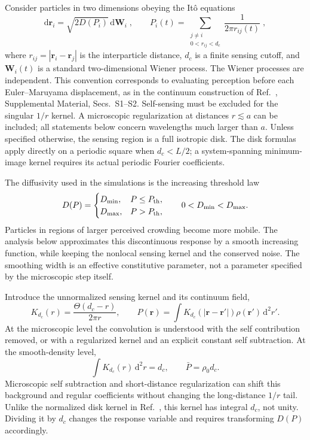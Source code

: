 \documentclass{article}
\begin{document}
Consider particles in two dimensions obeying the It\^{o} equations
\begin{equation}
    \mathrm d\mathbf r_i=\sqrt{2D(P_i)}\,\mathrm d\mathbf W_i \;,
    \qquad
    P_i(t)=\sum_{\substack{j\ne i\\0<r_{ij}<d_c}}\frac{1}{2\pi r_{ij}(t)}\;,
    \label{eq:ffParticle}
\end{equation}
where $r_{ij}=|\mathbf r_i-\mathbf r_j|$ is the interparticle distance, $d_c$ is a finite sensing cutoff, and $\mathbf W_i(t)$ is a standard two-dimensional Wiener process. 
The Wiener processes are independent. This convention corresponds to evaluating perception before each Euler--Maruyama displacement, as in the continuum construction of Ref.~\cite{Wu2026NonlocalSensing}, Supplemental Material, Secs.~S1--S2. Self-sensing must be excluded for the singular $1/r$ kernel. A microscopic regularization at distances $r\lesssim a$ can be included; all statements below concern wavelengths much larger than $a$. Unless specified otherwise, the sensing region is a full isotropic disk. The disk formulas apply directly on a periodic square when $d_c<L/2$; a system-spanning minimum-image kernel requires its actual periodic Fourier coefficients.

The diffusivity used in the simulations is the increasing threshold law
\begin{equation}
    D(P)=\begin{cases}
        D_{\min},&P\leq P_{\rm th},\\
        D_{\max},&P>P_{\rm th},
    \end{cases}
    \qquad 0<D_{\min}<D_{\max}.
    \label{eq:ffStepLaw}
\end{equation}
Particles in regions of larger perceived crowding become more mobile. The analysis below approximates this discontinuous response by a smooth increasing function, while keeping the nonlocal sensing kernel and the conserved noise. The smoothing width is an effective constitutive parameter, not a parameter specified by the microscopic step itself.

Introduce the unnormalized sensing kernel and its continuum field,
\begin{equation}
    K_{d_c}(r)=\frac{\Theta(d_c-r)}{2\pi r},\qquad
    P(\mathbf r)=\int K_{d_c}(|\mathbf r-\mathbf r'|)\rho(\mathbf r')\,\mathrm d^2r'.
    \label{eq:ffKernel}
\end{equation}
At the microscopic level the convolution is understood with the self contribution removed, or with a regularized kernel and an explicit constant self subtraction. At the smooth-density level,
\begin{equation}
    \int K_{d_c}(r)\,\mathrm d^2r=d_c,\qquad \bar P=\rho_0d_c.
    \label{eq:ffBackground}
\end{equation}
Microscopic self subtraction and short-distance regularization can shift this background and regular coefficients without changing the long-distance $1/r$ tail. Unlike the normalized disk kernel in Ref.~\cite{Wu2026NonlocalSensing}, this kernel has integral $d_c$, not unity. Dividing it by $d_c$ changes the response variable and requires transforming $D(P)$ accordingly.
\end{document}
